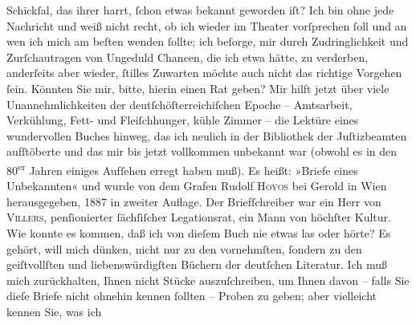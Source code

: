 \begin{ledgroupsized}[t]{13cm}
               Schickſal, das ihrer harrt, ſchon etwas bekannt geworden iſt? Ich bin ohne jede
               Nachricht und weiß nicht recht, ob ich wieder im Theater vorſprechen ſoll und an wen ich mich am beſten
               wenden ſollte; ich beſorge, mir durch Zudringlichkeit und Zurſchautragen von Ungeduld
               Chancen, die ich etwa hätte, zu verderben, anderſeits aber wieder, ſtilles Zuwarten
               möchte auch nicht das {\pb}richtige Vorgehen
               ſein. Könnten Sie mir, bitte, hierin einen Rat geben?\pend
           \pstart
           Mir hilft jetzt über viele Unannehmlichkeiten der deutſchöſterreichiſchen Epoche – Amtsarbeit, Verkühlung, Fett- und
               Fleiſchhunger, kühle Zimmer – die Lektüre eines wundervollen Buches hinweg, das ich
               neulich in der Bibliothek der Juſtizbeamten
               aufſtöberte und das mir bis jetzt vollkommen unbekannt war (obwohl es in den
                     80\textsuperscript{er} Jahren einiges Aufſehen erregt
               haben muß). Es heißt: »Briefe eines Unbekannten«
               und wurde von dem Grafen Rudolf \textsc{Hoyos} bei Gerold in Wien herausgegeben, 1887 in zweiter Auflage. Der Briefſchreiber
               war ein Herr von \textsc{Villers}, penſionierter ſächſiſcher Legationsrat,
               ein Mann von höchſter Kultur. Wie konnte es kommen, daß ich von dieſem Buch nie etwas
               las oder hörte? Es gehört, will mich dünken, nicht nur zu den vornehmſten, ſondern zu
               den geiſtvollſten und liebenswürdigſten Büchern der deutſchen {\pb}Literatur. Ich muß mich zurückhalten,
               Ihnen nicht Stücke auszuſchreiben, um Ihnen davon – falls Sie dieſe Briefe nicht
               ohnehin kennen ſollten – Proben zu geben; aber vielleicht kennen Sie, was ich

\end{ledgroupsized}
